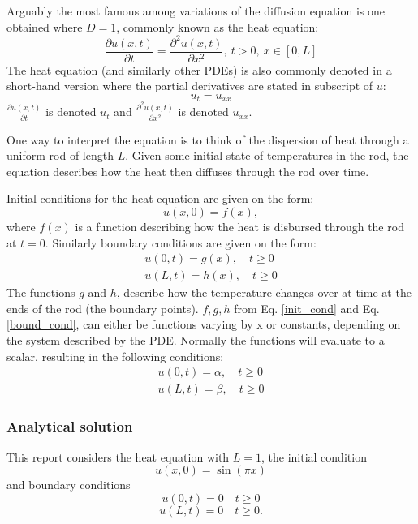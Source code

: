 Arguably the most famous among variations of the diffusion equation is one obtained where $D=1$, commonly known as the heat equation:
\begin{equation}\label{eq:diffu}
    \frac{\partial u(x,t)}{\partial t}=\frac{\partial^2 u(x,t)}{\partial x^2} , \ t>0, \ x\in [0, L]
\end{equation}
The heat equation (and similarly other PDEs) is also commonly denoted in a short-hand version where the partial derivatives are stated in subscript of $u$:  
\begin{equation}\label{u_tu_xx}
    u_t = u_{xx}
\end{equation}
$\frac{\partial u(x,t)}{\partial t}$ is denoted $u_t$ and $\frac{\partial^2 u(x,t)}{\partial x^2}$ is denoted $u_{xx}$.

One way to interpret the equation is to think of the dispersion of heat through a uniform rod of length $L$. Given some initial state of temperatures in the rod, the equation describes how the heat then diffuses through the rod over time. 

Initial conditions for the heat equation are given on the form: 
\begin{equation}\label{init_cond}
    u(x,0) = f(x),
\end{equation}
where $f(x)$ is a function describing how the heat is disbursed through the rod at $t=0$.
Similarly boundary conditions are given on the form: 
\begin{equation}\label{bound_cond}
    \begin{split}
        u(0, t) = g(x), \quad t \ge 0 \\
        u(L, t) = h(x), \quad t \ge 0
    \end{split}
\end{equation}
The functions $g$ and $h$, describe how the temperature changes over at time at the ends of the rod (the boundary points). 
$f, g, h$ from Eq. \ref{init_cond} and Eq. \ref{bound_cond}, can either be functions varying by x or constants, depending on the system described by the PDE. 
Normally the functions will evaluate to a scalar, resulting in the following conditions: 
\begin{equation}
    \begin{split}
        u(0, t) = \alpha, \quad t\geq0 \\
        u(L, t) = \beta, \quad t\geq0
    \end{split}
\end{equation}

\subsubsection{Analytical solution}\label{sec:anal_sol}
This report considers the heat equation with $L=1$, the initial condition
\begin{equation}
u(x, 0) = \sin(\pi x)    
\end{equation}
and boundary conditions
\begin{equation}
    u(0, t)=0 \quad t\ge0
\end{equation}
\begin{equation}
    u(L, t)=0 \quad t\ge 0.
\end{equation}

